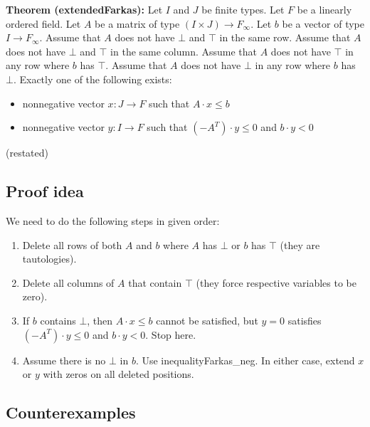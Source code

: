 \documentclass[]{article}
\renewcommand{\.}{\hskip .75pt}
\let\r=\rightarrow
\let\*=\cdot
\begin{document}
\textbf{Theorem (extendedFarkas):}
Let $I$ and $J$ be finite types.
Let $F$ be a linearly ordered field.
Let $A$ be a matrix of type $(I \times J) \r F_\infty$.
Let $b$ be a vector of type $I \r F_\infty$.
Assume that $A$ does not have $\bot$ and $\top$ in the same row.
Assume that $A$ does not have $\bot$ and $\top$ in the same column.
Assume that $A$ does not have $\top$ in any row where $b$ has $\top$.
Assume that $A$ does not have $\bot$ in any row where $b$ has~$\bot$.
Exactly one of the following exists:
\begin{itemize}
\item nonnegative vector $x : J \r F$ such that $A \* x \le b$
\item nonnegative vector $y : I \r F$ such that $(-A^T) \* y \le 0$ and $b \* y < 0$
\end{itemize}
(restated)

\subsection{Proof idea}
We need to do the following steps in given order:
\begin{enumerate}
\item Delete all rows of both $A$ and $b$ where $A$ has $\bot$ or $b$ has $\top$
(they are tautologies).
\item Delete all columns of $A$ that contain $\top$
(they force respective variables to be zero).
\item If $b$ contains $\bot$, then $A \* x \le b$ cannot be satisfied,
but $y = 0$ satisfies $(-A^T) \* y \le 0$ and $b \* y < 0$. Stop here.
\item Assume there is no $\bot$ in $b$. Use inequalityFarkas\_neg.
In either case, extend $x$ or $y$ with zeros on	all deleted positions.
\end{enumerate}

\subsection{Counterexamples}
\end{document}
